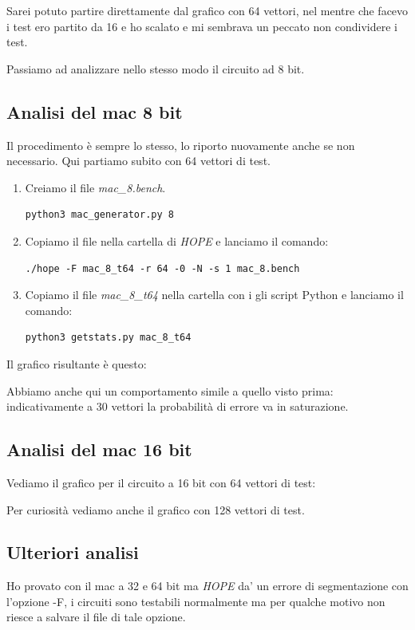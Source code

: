 \documentclass[12pt, letterpaper]{article}
\begin{document}
Sarei potuto partire direttamente dal grafico con 64 vettori, nel mentre che facevo i test ero partito da 16 e ho scalato e mi sembrava un peccato non condividere i test.

Passiamo ad analizzare nello stesso modo il circuito ad 8 bit.

\subsection{Analisi del mac 8 bit}

Il procedimento è sempre lo stesso, lo riporto nuovamente anche se non necessario.
Qui partiamo subito con 64 vettori di test.

\begin{enumerate}
\item Creiamo il file \textit{mac\_8.bench}.
\begin{lstlisting}
python3 mac_generator.py 8
\end{lstlisting}
\item Copiamo il file nella cartella di \textit{HOPE} e lanciamo il comando:
\begin{lstlisting}
./hope -F mac_8_t64 -r 64 -0 -N -s 1 mac_8.bench
\end{lstlisting}
\item Copiamo il file \textit{mac\_8\_t64} nella cartella con i gli script Python e lanciamo il comando:
\begin{lstlisting}
python3 getstats.py mac_8_t64
\end{lstlisting}
\end{enumerate}

Il grafico risultante è questo:



Abbiamo anche qui un comportamento simile a quello visto prima: indicativamente a 30 vettori la probabilità di errore va in saturazione.

\subsection{Analisi del mac 16 bit}
Vediamo il grafico per il circuito a 16 bit con 64 vettori di test:



Per curiosità vediamo anche il grafico con 128 vettori di test.



\subsection{Ulteriori analisi}

Ho provato con il mac a 32 e 64 bit ma \textit{HOPE} da' un errore di segmentazione con l'opzione -F, i circuiti sono testabili normalmente ma per qualche motivo non riesce a salvare il file di tale opzione.
\end{document}
